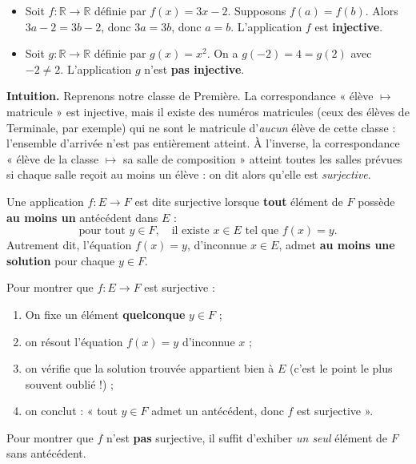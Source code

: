 \documentclass[11pt]{article}
\newcommand{\cle}[1]{{\popxbold\color{popdark}#1}}
\newcounter{popsec}
\newcounter{popsub}
\newcommand{\courssub}[1]{%
  \stepcounter{popsub}%
  \par\vspace{9pt}\noindent{\popxbold\fontsize{11.5}{13}\selectfont\color{popink}{\color{poporange}\thepopsec.\thepopsub}\hspace{6pt}#1}\par\nopagebreak\vspace{4pt}
}
\begin{document}
\begin{exemplebox}
\begin{itemize}
\item Soit $f : \mathbb{R} \to \mathbb{R}$ définie par $f(x) = 3x - 2$. Supposons $f(a) = f(b)$. Alors $3a - 2 = 3b - 2$, donc $3a = 3b$, donc $a = b$. L'application $f$ est \textbf{injective}.
\item Soit $g : \mathbb{R} \to \mathbb{R}$ définie par $g(x) = x^2$. On a $g(-2) = 4 = g(2)$ avec $-2 \neq 2$. L'application $g$ n'est \textbf{pas injective}.
\end{itemize}
\end{exemplebox}

\courssub{Applications surjectives}

\textbf{Intuition.} Reprenons notre classe de Première. La correspondance « élève $\mapsto$ matricule » est injective, mais il existe des numéros matricules (ceux des élèves de Terminale, par exemple) qui ne sont le matricule d'\emph{aucun} élève de cette classe : l'ensemble d'arrivée n'est pas entièrement atteint. À l'inverse, la correspondance « élève de la classe $\mapsto$ sa salle de composition » atteint toutes les salles prévues si chaque salle reçoit au moins un élève : on dit alors qu'elle est \emph{surjective}.

\begin{definition}
Une application $f : E \to F$ est dite \cle{surjective} lorsque \textbf{tout} élément de $F$ possède \textbf{au moins un} antécédent dans $E$ :
\[ \text{pour tout } y \in F, \quad \text{il existe } x \in E \text{ tel que } f(x) = y. \]
Autrement dit, l'équation $f(x) = y$, d'inconnue $x \in E$, admet \textbf{au moins une solution} pour chaque $y \in F$.
\end{definition}

\begin{methode}
Pour montrer que $f : E \to F$ est surjective :
\begin{enumerate}
\item On fixe un élément \textbf{quelconque} $y \in F$ ;
\item on résout l'équation $f(x) = y$ d'inconnue $x$ ;
\item on vérifie que la solution trouvée appartient bien à $E$ (c'est le point le plus souvent oublié !) ;
\item on conclut : « tout $y \in F$ admet un antécédent, donc $f$ est surjective ».
\end{enumerate}
Pour montrer que $f$ n'est \textbf{pas} surjective, il suffit d'exhiber \emph{un seul} élément de $F$ sans antécédent.
\end{methode}
\end{document}
